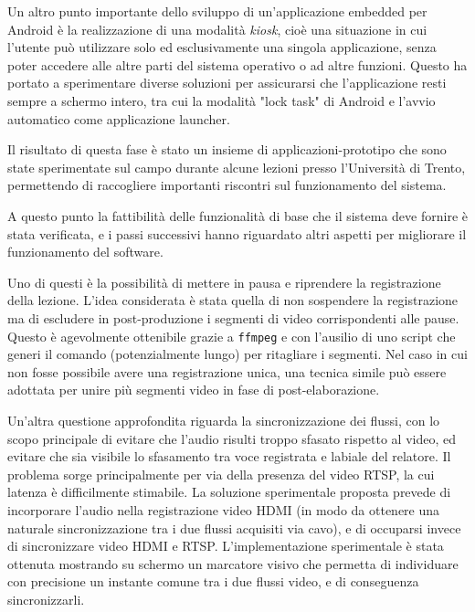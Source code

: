 Un altro punto importante dello sviluppo di un'applicazione embedded per Android è la realizzazione di una modalità \textit{kiosk}, cioè una situazione in cui l'utente può utilizzare solo ed esclusivamente una singola applicazione, senza poter accedere alle altre parti del sistema operativo o ad altre funzioni. Questo ha portato a sperimentare diverse soluzioni per assicurarsi che l'applicazione resti sempre a schermo intero, tra cui la modalità "lock task" di Android e l'avvio automatico come applicazione launcher.

Il risultato di questa fase è stato un insieme di applicazioni-prototipo che sono state sperimentate sul campo durante alcune lezioni presso l'Università di Trento, permettendo di raccogliere importanti riscontri sul funzionamento del sistema.

A questo punto la fattibilità delle funzionalità di base che il sistema deve fornire è stata verificata, e i passi successivi hanno riguardato altri aspetti per migliorare il funzionamento del software.

Uno di questi è la possibilità di mettere in pausa e riprendere la registrazione della lezione. L'idea considerata è stata quella di non sospendere la registrazione ma di escludere in post-produzione i segmenti di video corrispondenti alle pause. Questo è agevolmente ottenibile grazie a \texttt{ffmpeg} e con l'ausilio di uno script che generi il comando (potenzialmente lungo) per ritagliare i segmenti. Nel caso in cui non fosse possibile avere una registrazione unica, una tecnica simile può essere adottata per unire più segmenti video in fase di post-elaborazione.

Un'altra questione approfondita riguarda la sincronizzazione dei flussi, con lo scopo principale di evitare che l'audio risulti troppo sfasato rispetto al video, ed evitare che sia visibile lo sfasamento tra voce registrata e labiale del relatore. Il problema sorge principalmente per via della presenza del video RTSP, la cui latenza è difficilmente stimabile. La soluzione sperimentale proposta prevede di incorporare l'audio nella registrazione video HDMI (in modo da ottenere una naturale sincronizzazione tra i due flussi acquisiti via cavo), e di occuparsi invece di sincronizzare video HDMI e RTSP. L'implementazione sperimentale è stata ottenuta mostrando su schermo un marcatore visivo che permetta di individuare con precisione un instante comune tra i due flussi video, e di conseguenza sincronizzarli.

